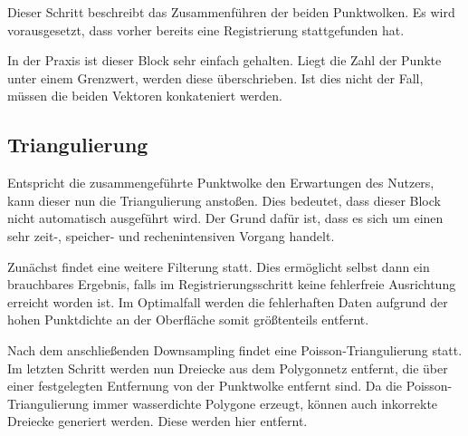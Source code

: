 Dieser Schritt beschreibt das Zusammenführen der beiden Punktwolken.
Es wird vorausgesetzt, dass vorher bereits eine Registrierung stattgefunden hat.

In der Praxis ist dieser Block sehr einfach gehalten.
Liegt die Zahl der Punkte unter einem Grenzwert, werden diese überschrieben.
Ist dies nicht der Fall, müssen die beiden Vektoren konkateniert werden.

\subsection{Triangulierung}
\label{subsec:pipeline-triangulierung}

Entspricht die zusammengeführte Punktwolke den Erwartungen des Nutzers, kann dieser nun die Triangulierung anstoßen.
Dies bedeutet, dass dieser Block nicht automatisch ausgeführt wird.
Der Grund dafür ist, dass es sich um einen sehr zeit-, speicher- und rechenintensiven Vorgang handelt.

Zunächst findet eine weitere Filterung statt.
Dies ermöglicht selbst dann ein brauchbares Ergebnis, falls im Registrierungsschritt keine fehlerfreie Ausrichtung erreicht worden ist.
Im Optimalfall werden die fehlerhaften Daten aufgrund der hohen Punktdichte an der Oberfläche somit größtenteils entfernt.

Nach dem anschließenden Downsampling findet eine Poisson-Triangulierung statt.
Im letzten Schritt werden nun Dreiecke aus dem Polygonnetz entfernt, die über einer festgelegten Entfernung von der Punktwolke entfernt sind.
Da die Poisson-Triangulierung immer wasserdichte Polygone erzeugt, können auch inkorrekte Dreiecke generiert werden.
Diese werden hier entfernt.
